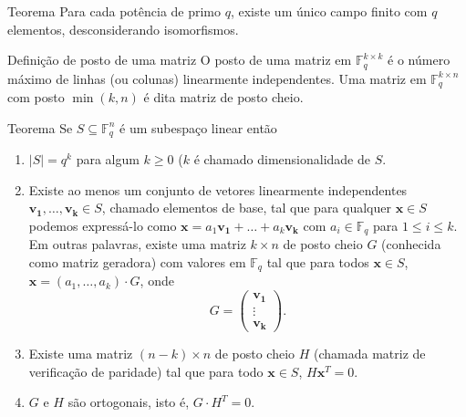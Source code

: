 \begin{frame}[allowframebreaks]
  \begin{block}{Teorema}
  Para cada potência de primo $q$, existe um único campo finito com $q$ elementos, desconsiderando isomorfismos.
  \end{block}

  \begin{block}{Definição de posto de uma matriz}
    O posto de uma matriz em $\mathbb{F}_q^{k \times k}$ é o número máximo de linhas (ou colunas) linearmente independentes.
    Uma matriz em $\mathbb{F}_q^{k \times n}$ com posto $\min(k,n)$ é dita matriz de posto cheio.
  \end{block}

  \begin{block}{Teorema}
    \small
    Se $S \subseteq \mathbb{F}_q^n$ é um subespaço linear então
    \begin{enumerate}
      \item $\vert S \vert = q^k$ para algum $k \geq 0$ ($k$ é chamado dimensionalidade de $S$.
      \item Existe ao menos um conjunto de vetores linearmente independentes $\mathbf{v_1},\ldots,\mathbf{v_k} \in S$, chamado elementos de base,
        tal que para qualquer $\mathbf{x} \in S$ podemos expressá-lo como $\mathbf{x} = a_1 \mathbf{v_1} + \ldots + a_k \mathbf{v_k}$ com
        $a_i \in \mathbb{F}_q$ para $1 \leq i \leq k$. Em outras palavras, existe uma matriz $k \times n$ de posto cheio $G$ (conhecida como matriz geradora)
        com valores em $\mathbb{F}_q$ tal que para todos $\mathbf{x} \in S$, $\mathbf{x} = (a_1,\ldots,a_k) \cdot G$, onde
        \begin{equation}
          G = \begin{pmatrix}
            \mathbf{v_1} \\
            \vdots \\
            \mathbf{v_k}
          \end{pmatrix}.
        \end{equation}
      \item Existe uma matriz $(n-k) \times n$ de posto cheio $H$ (chamada matriz de verificação de paridade) tal que para todo $\mathbf{x} \in S$, $H \mathbf{x}^T = 0$.
      \item $G$ e $H$ são ortogonais, isto é, $G \cdot H^T = 0$.
    \end{enumerate}
  \end{block}

\end{frame}


